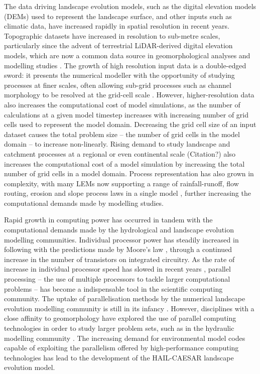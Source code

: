 The data driving landscape evolution models, such as the digital elevation models (DEMs) used to represent the landscape surface, and other inputs such as climatic data, have increased rapidly in spatial resolution in recent years. \citep[e.g.,][]{gesch2002national, rabus2003shuttle, tarolli2009understanding, casas2006topographic, krishnan2011opentopography} Topographic datasets have increased in resolution to sub-metre scales, particularly since the advent of terrestrial LiDAR-derived digital elevation models, which are now a common data source in geomorphological analyses and modelling studies \citep{bates2003optimal, clubb2014objective, passalacqua2010geometric}. The growth of high resolution input data is a double-edged sword: it presents the numerical modeller with the opportunity of studying processes at finer scales, often allowing sub-grid processes such as channel morphology to be resolved at the grid-cell scale \citep{schoorl2000three}. However, higher-resolution data also increases the computational cost of model simulations, as the number of calculations at a given model timestep increases with increasing number of grid cells used to represent the model domain. Decreasing the grid cell size of an input dataset causes the total problem size -- the number of grid cells in the model domain -- to increase non-linearly. Rising demand to study landscape and catchment processes at a regional or even continental scale (Citation?) also increases the computational cost of a model simulation by increasing the total number of grid cells in a model domain. Process representation has also grown in complexity, with many LEMs now supporting a range of rainfall-runoff, flow routing, erosion and slope process laws in a single model \citep{Coulthard2001, Tucker2010, hobley10creative}, further increasing the computational demands made by modelling studies. 

Rapid growth in computing power has occurred in tandem with the computational demands made by the hydrological and landscape evolution modelling communities. Individual processor power has steadily increased in following with the predictions made by Moore's law \citep{schaller1997moore, moore1998cramming}, through a continued increase in the number of transistors on integrated circuitry. As the rate of increase in individual processor speed has slowed in recent years \citep{mann2000end,colwell2013chip}, parallel processing -- the use of multiple processors to tackle larger computational problems --  has become a indispensable tool in the scientific computing community. The uptake of parallelisation methods by the numerical landscape evolution modelling community is still in its infancy \citep{valters2016modelling}. However, disciplines with a close affinity to geomorphology have explored the use of parallel computing technologies in order to study larger problem sets, such as in the hydraulic modelling community \cite[e.g.,][]{ivanov2004catchment, neal2009parallelisation, kollet2010proof, smith2013towards, liang2015high,smith2015towards}. The increasing demand for environmental model codes capable of exploiting the parallelism offered by high-performance computing technologies has lead to the development of the HAIL-CAESAR landscape evolution model.

